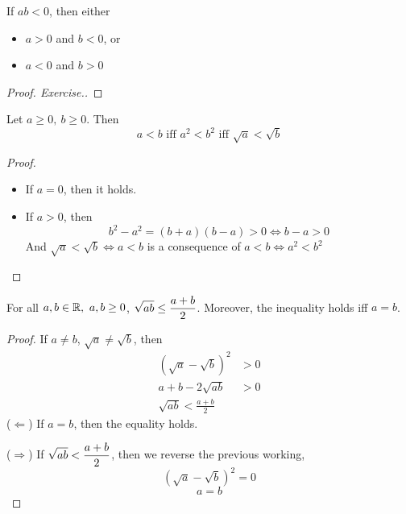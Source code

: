 \documentclass[a4paper,12pt]{article}
\begin{document}
\begin{corollary}
    If \(ab<0\), then either 
    \begin{itemize}
        \item \(a>0\) and \(b<0\), or 
        \item \(a<0\) and \(b>0\)
    \end{itemize}
    \begin{proof}[Proof. Exercise.]
        
    \end{proof}
\end{corollary}

\begin{proposition}
    Let \(a\ge 0,\ b\ge 0\). Then 
    \[a<b \text{ iff }a^2<b^2\text{ iff }\sqrt{a}<\sqrt{b}\]
    \begin{proof}\ 
        \begin{itemize}
            \item If \(a=0\), then it holds.
            \item If \(a>0\), then 
            \[b^2-a^2=(b+a)(b-a)>0\Leftrightarrow b-a>0\]
            And \(\sqrt{a}<\sqrt{b}\Leftrightarrow a<b\) is a consequence of \(a<b\Leftrightarrow a^2<b^2\)
        \end{itemize}
    \end{proof}
\end{proposition}

\newpage

\begin{theorem}
    For all \(a,b\in\mathbb{R},\ a,b\ge0\), \(\displaystyle \sqrt{ab}\le\frac{a+b }{2}\). Moreover, the inequality holds iff \(a=b\). 
    \begin{proof}
        If \(a\neq b\), \(\sqrt{a}\neq\sqrt{b}\), then 
        \begin{align*}
            (\sqrt{a}-\sqrt{b})^2&>0\\
            a+b-2\sqrt{ab}&>0\\
            \sqrt{ab}<\frac{a+b }{2}
        \end{align*}
        (\(\Leftarrow\)) If \(a=b\), then the equality holds.

        (\(\Rightarrow\)) If \(\displaystyle\sqrt{ab}<\frac{a+b }{2}\), then we reverse the previous working, 
        \[(\sqrt{a}-\sqrt{b})^2=0\]
        \[a=b\]
    \end{proof}
\end{theorem}
\end{document}
